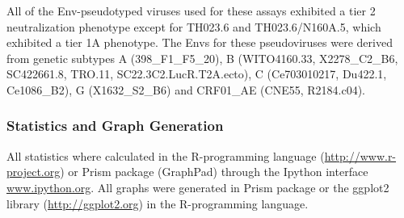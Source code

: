 All of the Env-pseudotyped viruses used for these assays exhibited a tier 2 neutralization phenotype except for TH023.6 and TH023.6/N160A.5, which exhibited a tier 1A phenotype. The Envs for these pseudoviruses were derived from genetic subtypes A (398\_F1\_F5\_20), B (WITO4160.33, X2278\_C2\_B6, SC422661.8, TRO.11, SC22.3C2.LucR.T2A.ecto), C (Ce703010217, Du422.1, Ce1086\_B2), G (X1632\_S2\_B6) and CRF01\_AE (CNE55, R2184.c04).

\subsubsection{Statistics and Graph Generation}
All statistics where calculated in the R-programming language (\url{http://www.r-project.org}) or Prism package (GraphPad) through the Ipython interface \url{www.ipython.org}. All graphs were generated in Prism package or the ggplot2 library (\url{http://ggplot2.org}) in the R-programming language.
\clearpage